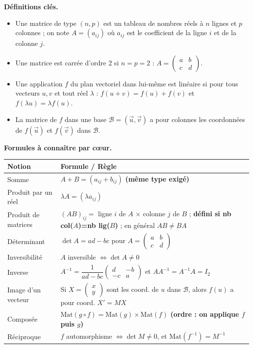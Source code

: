 \documentclass[11pt]{article}
\newcommand{\cle}[1]{{\popxbold\color{popdark}#1}}
\begin{document}
\begin{aretenir}[L'essentiel de la le\c{c}on]
\textbf{D\'efinitions cl\'es.}
\begin{itemize}
  \item Une \cle{matrice} de type $(n,p)$ est un tableau de nombres r\'eels \`a $n$ lignes et $p$ colonnes ; on note $A=(a_{ij})$ o\`u $a_{ij}$ est le coefficient de la ligne $i$ et de la colonne $j$.
  \item Une matrice est \cle{carr\'ee d'ordre 2} si $n=p=2$ : $A=\begin{pmatrix} a & b \\ c & d \end{pmatrix}$.
  \item Une application $f$ du plan vectoriel dans lui-m\^eme est \cle{lin\'eaire} si pour tous vecteurs $u,v$ et tout r\'eel $\lambda$ :
        $f(u+v)=f(u)+f(v)$ et $f(\lambda u)=\lambda f(u)$.
  \item La \cle{matrice de $f$} dans une base $\mathcal{B}=(\vec{u},\vec{v})$ a pour colonnes les coordonn\'ees de $f(\vec{u})$ et $f(\vec{v})$ dans $\mathcal{B}$.
\end{itemize}

\textbf{Formules \`a conna\^itre par c\oe ur.}
\begin{center}
\begin{tabularx}{\linewidth}{|l|X|}\hline
\rowcolor{popblueL} \textbf{Notion} & \textbf{Formule / R\`egle} \\ \hline
Somme & $A+B=(a_{ij}+b_{ij})$ \textbf{(m\^eme type exig\'e)} \\ \hline
Produit par un r\'eel & $\lambda A=(\lambda a_{ij})$ \\ \hline
Produit de matrices & $(AB)_{ij}=$ ligne $i$ de $A$ $\times$ colonne $j$ de $B$ ; \textbf{d\'efini si nb col($A$)=nb lig($B$)} ; en g\'en\'eral $AB\neq BA$ \\ \hline
D\'eterminant & $\det A = ad-bc$ pour $A=\begin{pmatrix} a & b \\ c & d \end{pmatrix}$ \\ \hline
Inversibilit\'e & $A$ inversible $\iff \det A \neq 0$ \\ \hline
Inverse & $A^{-1}=\dfrac{1}{ad-bc}\begin{pmatrix} d & -b \\ -c & a \end{pmatrix}$ et $AA^{-1}=A^{-1}A=I_2$ \\ \hline
Image d'un vecteur & Si $X=\begin{pmatrix} x \\ y \end{pmatrix}$ sont les coord. de $u$ dans $\mathcal{B}$, alors $f(u)$ a pour coord. $X'=MX$ \\ \hline
Compos\'ee & $\mathrm{Mat}(g\circ f)=\mathrm{Mat}(g)\times\mathrm{Mat}(f)$ \textbf{(ordre : on applique $f$ puis $g$)} \\ \hline
R\'eciproque & $f$ automorphisme $\iff \det M \neq 0$, et $\mathrm{Mat}(f^{-1})=M^{-1}$ \\ \hline
\end{tabularx}
\end{center}


\end{aretenir}
\end{document}
